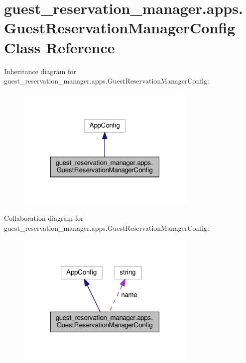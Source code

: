 \hypertarget{classguest__reservation__manager_1_1apps_1_1GuestReservationManagerConfig}{\section{guest\-\_\-reservation\-\_\-manager.\-apps.\-Guest\-Reservation\-Manager\-Config Class Reference}
\label{classguest__reservation__manager_1_1apps_1_1GuestReservationManagerConfig}
}


Inheritance diagram for guest\-\_\-reservation\-\_\-manager.\-apps.\-Guest\-Reservation\-Manager\-Config\-:
\nopagebreak
\begin{figure}[H]
\begin{center}
\leavevmode
\includegraphics[width=244pt]{classguest__reservation__manager_1_1apps_1_1GuestReservationManagerConfig__inherit__graph}
\end{center}
\end{figure}


Collaboration diagram for guest\-\_\-reservation\-\_\-manager.\-apps.\-Guest\-Reservation\-Manager\-Config\-:
\nopagebreak
\begin{figure}[H]
\begin{center}
\leavevmode
\includegraphics[width=244pt]{classguest__reservation__manager_1_1apps_1_1GuestReservationManagerConfig__coll__graph}
\end{center}
\end{figure}
